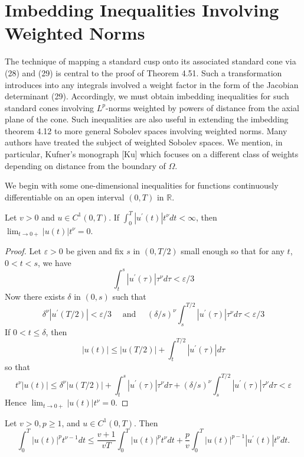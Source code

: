 \section{Imbedding Inequalities Involving Weighted Norms}


\begin{para}
  The technique of mapping a standard cusp onto its associated standard cone via (28) and (29) is central to the proof of Theorem 4.51. Such a transformation introduces into any integrals involved a weight factor in the form of the Jacobian determinant (29). Accordingly, we must obtain imbedding inequalities for such standard cones involving $L^p$-norms weighted by powers of distance from the axial plane of the cone. Such inequalities are also useful in extending the imbedding theorem 4.12 to more general Sobolev spaces involving weighted norms. Many authors have treated the subject of weighted Sobolev spaces. We mention, in
  particular, Kufner's monograph [Ku] which focuses on a different class of weights depending on distance from the boundary of $\Omega$.
\end{para}

We begin with some one-dimensional inequalities for functions continuously differentiable on an open interval $(0, T)$ in $\mathbb{R}$.


\begin{lemma}
  Let $v>0$ and $u \in C^1(0, T)$. If $\int_0^T\left|u^{\prime}(t)\right| t^\nu d t<\infty$, then $\lim _{t \rightarrow 0+}|u(t)| t^\nu=0$.
\end{lemma}

\begin{proof}
  Let $\varepsilon>0$ be given and fix $s$ in $(0, T / 2)$ small enough so that for any $t$, $0<t<s$, we have
  \[
  \int_t^s\left|u^{\prime}(\tau)\right| \tau^\nu d \tau<\varepsilon / 3
  \]
  Now there exists $\delta$ in $(0, s)$ such that
  \[
  \delta^\nu\left|u^{\prime}(T / 2)\right|<\varepsilon / 3 \quad \text { and } \quad(\delta / s)^\nu \int_s^{T / 2}\left|u^{\prime}(\tau)\right| \tau^\nu d \tau<\varepsilon / 3
  \]
  If $0<t \leq \delta$, then
  \[
  |u(t)| \leq|u(T / 2)|+\int_t^{T / 2}\left|u^{\prime}(\tau)\right| d \tau
  \]
  so that
  \[
  t^\nu|u(t)| \leq \delta^\nu|u(T / 2)|+\int_t^s\left|u^{\prime}(\tau)\right| \tau^\nu d \tau+(\delta / s)^\nu \int_s^{T / 2}\left|u^{\prime}(\tau)\right| \tau^\nu d \tau<\varepsilon
  \]
  Hence $\lim _{t \rightarrow 0+}|u(t)| t^\nu=0$.
\end{proof}


\begin{lemma}
  Let $v>0, p \geq 1$, and $u \in C^1(0, T)$. Then
  \[
  \int_0^T|u(t)|^p t^{\nu-1} d t \leq \frac{v+1}{v T} \int_0^T|u(t)|^p t^\nu d t+\frac{p}{v} \int_0^T|u(t)|^{p-1}\left|u^{\prime}(t)\right| t^\nu d t .
  \]
\end{lemma}

